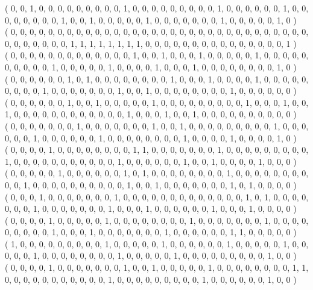 \documentclass{article}
\begin{document}
{( 0, 0, 1, 0, 0, 0, 0, 0, 0, 0, 0, 0, 1, 0, 0, 0, 0, 0, 0, 0, 0, 0, 1, 0, 0, 0, 0, 0, 0, 1, 0, 0, 0, 0, 0, 0, 0, 0, 1, 0, 0, 1, 0, 0, 0, 0, 0, 1, 0, 0, 0, 0, 0, 0, 0, 1, 0, 0, 0, 0, 0, 1, 0 )\\
( 0, 0, 0, 0, 0, 0, 0, 0, 0, 0, 0, 0, 0, 0, 0, 0, 0, 0, 0, 0, 0, 0, 0, 0, 0, 0, 0, 0, 0, 0, 0, 0, 0, 0, 0, 0, 0, 0, 0, 1, 1, 1, 1, 1, 1, 1, 1, 0, 0, 0, 0, 0, 0, 0, 0, 0, 0, 0, 0, 0, 0, 0, 1 )\\
( 0, 0, 0, 0, 0, 0, 0, 0, 0, 0, 0, 0, 0, 1, 0, 0, 1, 0, 0, 0, 1, 0, 0, 0, 0, 0, 1, 0, 0, 0, 0, 0, 0, 0, 0, 0, 0, 1, 0, 0, 0, 0, 0, 1, 0, 0, 0, 0, 1, 0, 0, 0, 1, 0, 0, 0, 0, 0, 0, 0, 0, 1, 0 )\\
( 0, 0, 0, 0, 0, 0, 1, 0, 1, 0, 0, 0, 0, 0, 0, 0, 0, 1, 0, 0, 0, 1, 0, 0, 0, 0, 1, 0, 0, 0, 0, 0, 0, 0, 0, 0, 1, 0, 0, 0, 0, 0, 0, 0, 1, 0, 0, 1, 0, 0, 0, 0, 0, 0, 0, 0, 1, 0, 0, 0, 0, 0, 0 )\\
( 0, 0, 0, 0, 0, 0, 1, 0, 0, 1, 0, 0, 0, 0, 0, 1, 0, 0, 0, 0, 0, 0, 0, 0, 0, 1, 0, 0, 0, 1, 0, 0, 1, 0, 0, 0, 0, 0, 0, 0, 0, 0, 0, 0, 0, 1, 0, 0, 0, 1, 0, 0, 1, 0, 0, 0, 0, 0, 0, 0, 0, 0, 0 )\\
( 0, 0, 0, 0, 0, 0, 0, 1, 0, 0, 0, 0, 0, 0, 0, 1, 0, 0, 1, 0, 0, 0, 0, 0, 0, 0, 0, 0, 1, 0, 0, 0, 0, 0, 0, 1, 0, 0, 0, 0, 0, 0, 1, 0, 0, 0, 0, 0, 0, 0, 0, 1, 0, 0, 0, 0, 1, 0, 0, 0, 0, 1, 0 )\\
( 0, 0, 0, 0, 1, 0, 0, 0, 0, 0, 0, 0, 0, 1, 1, 0, 0, 0, 0, 0, 0, 0, 1, 0, 0, 0, 0, 0, 0, 0, 0, 0, 1, 0, 0, 0, 0, 0, 0, 0, 0, 0, 0, 0, 1, 0, 0, 0, 0, 0, 0, 1, 0, 0, 1, 0, 0, 0, 0, 1, 0, 0, 0 )\\
( 0, 0, 0, 0, 0, 1, 0, 0, 0, 0, 0, 0, 1, 0, 1, 0, 0, 0, 0, 0, 0, 0, 0, 1, 0, 0, 0, 0, 0, 0, 0, 0, 0, 0, 1, 0, 0, 0, 0, 0, 0, 0, 0, 0, 0, 1, 0, 0, 1, 0, 0, 0, 0, 0, 0, 0, 1, 0, 1, 0, 0, 0, 0 )\\
( 0, 0, 0, 1, 0, 0, 0, 0, 0, 0, 0, 1, 0, 0, 0, 0, 0, 0, 0, 0, 0, 0, 0, 0, 0, 1, 0, 1, 0, 0, 0, 0, 0, 0, 0, 1, 0, 0, 0, 0, 0, 0, 0, 1, 0, 0, 0, 1, 0, 0, 0, 0, 0, 0, 1, 0, 0, 0, 1, 0, 0, 0, 0 )\\
( 0, 0, 0, 0, 1, 0, 0, 0, 0, 0, 1, 0, 0, 0, 0, 0, 0, 0, 0, 1, 0, 0, 0, 0, 0, 0, 0, 1, 0, 0, 0, 0, 0, 0, 0, 0, 0, 1, 0, 0, 0, 1, 0, 0, 0, 0, 0, 0, 0, 1, 0, 0, 0, 0, 0, 0, 1, 1, 0, 0, 0, 0, 0 )\\
( 1, 0, 0, 0, 0, 0, 0, 0, 0, 0, 1, 0, 0, 0, 0, 0, 1, 0, 0, 0, 0, 0, 0, 1, 0, 0, 0, 0, 0, 1, 0, 0, 0, 0, 0, 1, 0, 0, 0, 0, 0, 0, 0, 0, 1, 0, 0, 0, 0, 0, 1, 0, 0, 0, 0, 0, 0, 0, 0, 0, 1, 0, 0 )\\
( 0, 0, 0, 0, 1, 0, 0, 0, 0, 0, 0, 0, 1, 0, 0, 1, 0, 0, 0, 0, 0, 1, 0, 0, 0, 0, 0, 0, 0, 0, 1, 1, 0, 0, 0, 0, 0, 0, 0, 0, 0, 0, 0, 1, 0, 0, 0, 0, 0, 0, 0, 0, 0, 1, 0, 0, 0, 0, 0, 0, 1, 0, 0 )\\
}
\end{document}

